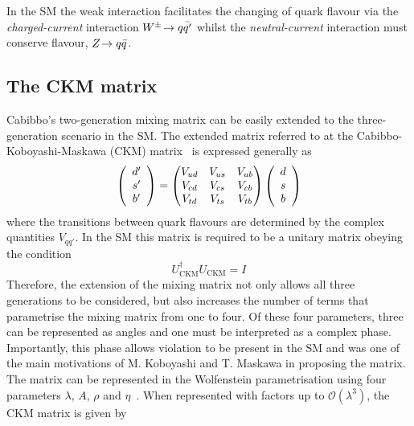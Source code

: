 In the SM the weak interaction facilitates the changing of quark flavour via the \emph{charged-current} interaction ${W^\pm}\!\rightarrow q\bar{q'}$ whilst the \emph{neutral-current} interaction must conserve flavour, ${Z}\!\rightarrow q\bar{q}$. 


\subsection{The CKM matrix}
Cabibbo's two-generation mixing matrix can be easily extended to the three-generation scenario in the SM. The extended matrix referred to at the Cabibbo-Koboyashi-Maskawa (CKM) matrix~\cite{CKM} is expressed generally as 
\begin{equation}
\left( \begin{array}{c} d' \\ s'  \\ b' \end{array} \right) = \begin{pmatrix} {\ensuremath{V_{{u}{d}}}} & {V_{{u}{s}}} & {V_{{u}{b}}} \\ {V_{{c}{d}}} & {V_{{c}{s}}} & {V_{{c}{b}}}  \\ {V_{{t}{d}}} & {V_{{t}{s}}} & {V_{{t}{b}}} \end{pmatrix} \left( \begin{array}{c} d \\ s  \\ b \end{array} \right)
\end{equation}
where the transitions between quark flavours are determined by the complex quantities $V_{qq'}$. 
In the SM this matrix is required to be a unitary matrix obeying the condition
\begin{equation}
U_{\text{CKM}}^\dag U_{\text{CKM}} = I
\end{equation}
Therefore, the extension of the mixing matrix not only allows all three generations to be considered, but also increases the number of terms that parametrise the mixing matrix from one to four. Of these four parameters, three can be represented as angles and one must be interpreted as a complex phase. Importantly, this phase allows \CP violation to be present in the SM and was one of the main motivations of M. Koboyashi and T. Maskawa in proposing the matrix.
The matrix can be represented in the Wolfenstein parametrisation using four parameters $\lambda$, $A$, $\rho$ and $\eta$~\cite{PhysRevLett.51.1945}. When represented with factors up to $\mathcal{O}(\lambda^{3})$, the CKM matrix is given by 

